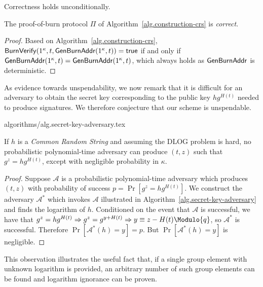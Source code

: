 Correctness holds unconditionally.

\begin{theorem}[Correctness]
  The proof-of-burn protocol $\Pi$ of Algorithm~\ref{alg.construction-crs} is \emph{correct}.
\end{theorem}
\begin{proof}
  Based on Algorithm~\ref{alg.construction-crs}, $\mathsf{BurnVerify}(1^\kappa, t, \mathsf{Gen}\-\mathsf{Burn}\-\mathsf{Addr}(1^\kappa, t)) = \textsf{true}$ if and only if $\mathsf{Gen}\-\mathsf{Burn}\-\mathsf{Addr}(1^\kappa, t) = \mathsf{Gen}\-\mathsf{Burn}\-\mathsf{Addr}(1^\kappa, t)$, which always holds as $\mathsf{Gen}\-\mathsf{Burn}\-\mathsf{Addr}$ is deterministic.
\end{proof}

As evidence towards unspendability, we now remark that it is difficult for an adversary to obtain the secret key corresponding to the public key $h g^{H(t)}$ needed to produce signatures. We therefore conjecture that our scheme is unspendable.

{algorithms/alg.secret-key-adversary.tex}

\begin{lemma}
  If $h$ is a \emph{Common Random String} and assuming the DLOG problem is hard, no probabilistic polynomial-time adversary can produce $(t, z)$ such that $g^z = h g^{H(t)}$, except with negligible probability in $\kappa$.
\end{lemma}
\begin{proof}
  Suppose $\mathcal{A}$ is a probabilistic polynomial-time adversary which produces $(t, z)$ with probability of success $p = \Pr[g^z = h g^{H(t)}]$.
  We construct the adversary $\mathcal{A}^*$ which invokes $\mathcal{A}$
  illustrated in Algorithm~\ref{alg.secret-key-adversary} and finds the
  logarithm of $h$.
  Conditioned on the event that $\mathcal{A}$ is successful,
  we have that
  $g^z = h g^{H(t)} \Rightarrow g^z = g^{y + H(t)} \Rightarrow y \equiv z - H(t) \Modulo{q}$, so $\mathcal{A}^*$ is successful.
  Therefore $\Pr[\mathcal{A}^*(h) = y] = p$.
  But $\Pr[\mathcal{A}^*(h) = y]$ is negligible.
\end{proof}

This observation illustrates the useful fact that, if a single group element with unknown logarithm is provided, an arbitrary number of such group elements can be found and logarithm ignorance can be proven.

